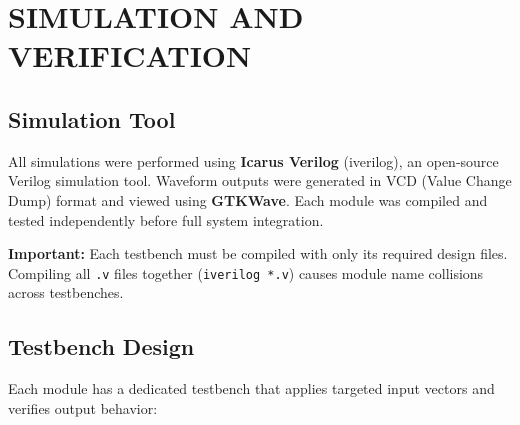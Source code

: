 \documentclass[12pt,a4paper]{article}
\begin{document}
\section{SIMULATION AND VERIFICATION}

\subsection{Simulation Tool}

All simulations were performed using \textbf{Icarus Verilog} (iverilog), an open-source Verilog simulation tool. Waveform outputs were generated in VCD (Value Change Dump) format and viewed using \textbf{GTKWave}. Each module was compiled and tested independently before full system integration.

\textbf{Important:} Each testbench must be compiled with only its required design files. Compiling all \texttt{.v} files together (\texttt{iverilog *.v}) causes module name collisions across testbenches.

\subsection{Testbench Design}

Each module has a dedicated testbench that applies targeted input vectors and verifies output behavior:
\end{document}
